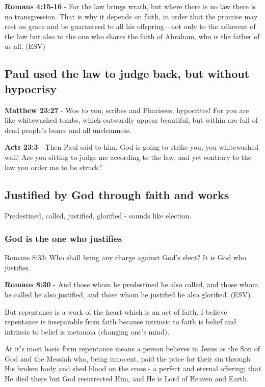 \documentclass[11pt]{article}
\begin{document}
\textbf{Romans 4:15-16} - For the law brings wrath, but where there is no law there is no transgression. That is why it depends on faith, in order that the promise may rest on grace and be guaranteed to all his offspring—not only to the adherent of the law but also to the one who shares the faith of Abraham, who is the father of us all, (ESV)

\subsection{Paul used the law to judge back, but without hypocrisy}
\label{sec:orgbcada4b}
\textbf{Matthew 23:27} - Woe to you, scribes and Pharisees, hypocrites! For you are like whitewashed tombs, which outwardly appear beautiful, but within are full of dead people's bones and all uncleanness.

\textbf{Acts 23:3} - Then Paul said to him, God is going to strike you, you whitewashed wall! Are you sitting to judge me according to the law, and yet contrary to the law you order me to be struck?

\subsection{Justified by God through faith and works}
\label{sec:orgf4fb4db}
Predestined, called, justified, glorified - sounds like election.
\subsubsection{God is the one who justifies}
\label{sec:orgcf04f8e}

Romans 8:33: Who shall bring any charge against God's elect? It is God who justifies.

\textbf{Romans 8:30} - And those whom he predestined he also called, and those whom he called he also justified, and those whom he justified he also glorified. (ESV)

But repentance is a work of the heart which is an act of faith.
I believe repentance is inseparable from faith because intrinsic to faith is belief and intrinsic to belief is metanoia (changing one's mind).

At it's most basic form repentance means a person believes in Jesus as the Son of God and the Messiah who, being innocent, paid the price for their sin through His broken body and shed blood on the cross - a perfect and eternal offering; that He died there but God resurrected Him, and He is Lord of Heaven and Earth.
\end{document}
